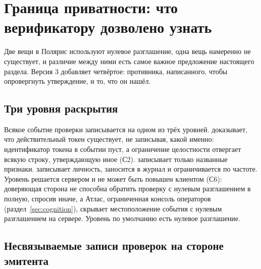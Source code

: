 \section{Граница приватности: что верификатору дозволено узнать}
\label{sec:privacy}



Две вещи в Полярис используют нулевое разглашение, одна вещь намеренно не существует, и различие
между ними есть самое важное предложение настоящего раздела. Версия 3 добавляет четвёртое:
противника, написанного, чтобы опровергнуть утверждение, и то, что он нашёл.

\subsection{Три уровня раскрытия}

Всякое событие проверки записывается на одном из трёх уровней.  доказывает,
что действительный токен существует, не записывая, какой именно: идентификатор токена в событии
пуст, а ограничение целостности отвергает всякую строку, утверждающую иное (С2). 
записывает только названные признаки.  записывает личность, заносится в журнал и
ограничивается по частоте. Уровень решается сервером и не может быть повышен клиентом (С6):
доверяющая сторона не способна обратить проверку с нулевым разглашением в полную, спросив иначе, а
Атлас, ограниченная консоль операторов (раздел~\ref{sec:cognition}), скрывает местоположение события с нулевым разглашением на сервере. Уровень по умолчанию есть
нулевое разглашение. \sImpl

\subsection{Несвязываемые записи проверок на стороне эмитента}

